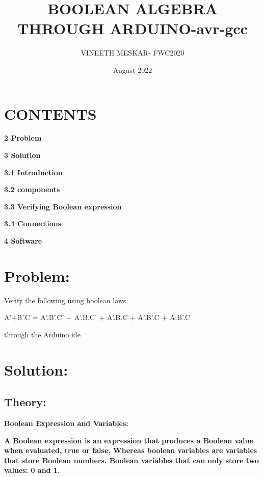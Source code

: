 \documentclass[a4paper,12pt,twocolumn]{article}
\title{BOOLEAN ALGEBRA THROUGH ARDUINO-avr-gcc}
\author{VINEETH MESKAR- FWC2020}
\date{August 2022}
\begin{document}
\maketitle
\section{\centering CONTENTS}

\textbf{ 2 Problem}

\textbf{ 3 Solution}

\textbf{ 3.1 Introduction}

\textbf{ 3.2 components}

\textbf{ 3.3 Verifying Boolean expression}

\textbf{ 3.4 Connections}

\textbf{ 4 Software}

\section{Problem:}
Verify the following using boolean laws:

A'+B'.C = A'.B'.C' + A'.B.C' + A'.B.C + A'.B'.C + A.B'.C

through the Arduino ide
\maketitle\section{Solution:}
\subsection{Theory:}
\textbf{Boolean Expression and Variables:}

\textbf{A Boolean expression is an expression that produces a Boolean value when evaluated, true or false, Whereas boolean variables are variables that store Boolean numbers. Boolean variables that can only store two values: 0 and 1.}
\end{document}
